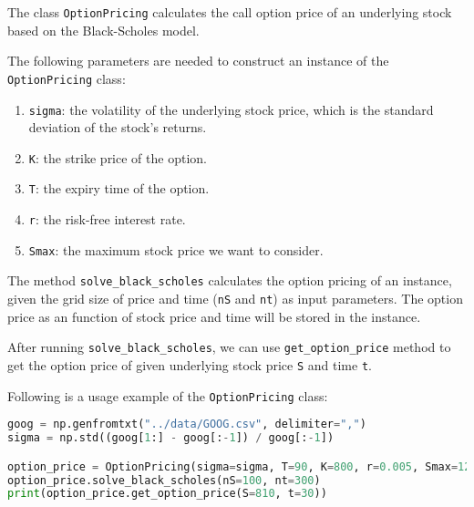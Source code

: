 
The class \texttt{OptionPricing} calculates the call option price of an underlying
stock based on the Black-Scholes model.

The following parameters are needed to construct an instance of the
\texttt{OptionPricing} class:
\begin{enumerate}
  \item \texttt{sigma}:
    the volatility of the underlying stock price, which is the standard
    deviation of the stock's returns.
  \item \texttt{K}:
    the strike price of the option.
  \item \texttt{T}:
    the expiry time of the option.
  \item \texttt{r}:
    the risk-free interest rate.
  \item \texttt{Smax}:
    the maximum stock price we want to consider.
\end{enumerate}

The method \texttt{solve\_black\_scholes} calculates the option pricing of an
instance, given the grid size of price and time (\texttt{nS} and \texttt{nt}) as
input parameters. The option price as an function of stock price and time will
be stored in the instance.

After running \texttt{solve\_black\_scholes}, we can use 
\texttt{get\_option\_price} method to get the option price of given underlying
stock price \texttt{S} and time \texttt{t}.

Following is a usage example of the \texttt{OptionPricing} class:
\begin{lstlisting}[language=Python]
goog = np.genfromtxt("../data/GOOG.csv", delimiter=",")
sigma = np.std((goog[1:] - goog[:-1]) / goog[:-1])

option_price = OptionPricing(sigma=sigma, T=90, K=800, r=0.005, Smax=1200)
option_price.solve_black_scholes(nS=100, nt=300)
print(option_price.get_option_price(S=810, t=30))
\end{lstlisting}
